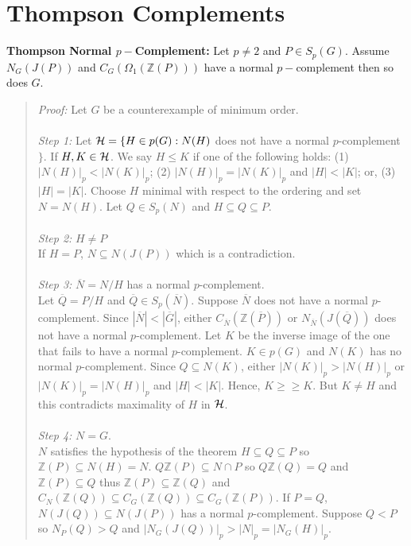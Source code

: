 \section{Thompson Complements}
{\bf Thompson Normal $p-$Complement:}
Let $p \ne 2$ and $P \in S_p(G)$.  Assume $N_G(J(P))$
and $C_G(\Omega_1({\mathbb Z}(P)))$ have a normal $p-$complement then so does $G$.
\begin{quote}
\emph{Proof:}  
Let $G$ be a counterexample of minimum order.
\\
\\
\emph{Step 1:}  Let ${\cal H}= \{ H \in p(G): N(H)$ does not have a normal $p$-complement $\}$.
If $H, K \in {\cal H}$.  We say $H \le K$ if one of the following holds:
(1) $|N(H)|_p < |N(K)|_p$;
(2) $|N(H)|_p = |N(K)|_p$ and $|H| < |K|$; or,
(3) $|H| = |K|$.  Choose $H$ minimal with respect to the ordering and set
$N=N(H)$.  Let $Q \in S_p(N)$ and $H \subseteq Q \subseteq P$.
\\
\\
\emph{Step 2:} $H \ne P$
\\
If $H=P$, $N \subseteq N(J(P))$ which is a contradiction.
\\
\\
\emph{Step 3:} ${\overline N}= N/H$ has a normal $p$-complement.
\\
Let ${\overline Q}= P/H$ and ${\overline Q} \in S_p({\overline N})$.  Suppose
${\overline N}$ does not have a
normal $p$-complement.
Since $|{\overline N}| < |{\overline G}|$, either 
$C_{\overline N}({\mathbb Z}({\overline P}))$ or
$N_{\overline N}(J({\overline Q}))$ does not have a 
normal $p$-complement.  Let $K$ be the inverse image of the one that fails to have a
normal $p$-complement.  $K \in p(G)$ and $N(K)$ has no
normal $p$-complement.  Since $Q \subseteq N(K)$, either
$|N(K)|_p > |N(H)|_p$ or
$|N(K)|_p = |N(H)|_p$ and $|H| < |K|$.  Hence, $K \ge \ge K$.  But $K \ne H$ and this
contradicts maximality of $H$ in ${\cal H}$.
\\
\\
\emph{Step 4:} $N=G$.
\\
$N$ satisfies the hypothesis of the theorem $H \subseteq Q \subseteq P$ so
${\mathbb Z}(P) \subseteq  N(H) =N$.
$Q {\mathbb Z}(P) \subseteq N \cap P$ so $Q {\mathbb Z}(Q) = Q$ and
${\mathbb Z}(P) \subseteq Q$ thus $
{\mathbb Z}(P) \subseteq
{\mathbb Z}(Q)$ and $C_N({\mathbb Z}(Q)) \subseteq 
C_G({\mathbb Z}(Q)) \subseteq C_G({\mathbb Z}(P))$.
If $P= Q$, $N(J(Q)) \subseteq N(J(P))$ has a
normal $p$-complement.
Suppose $Q < P$  so $N_P(Q) > Q$ and $|N_G(J(Q))|_p > |N|_p = |N_G(H)|_p$.

\end{quote}
